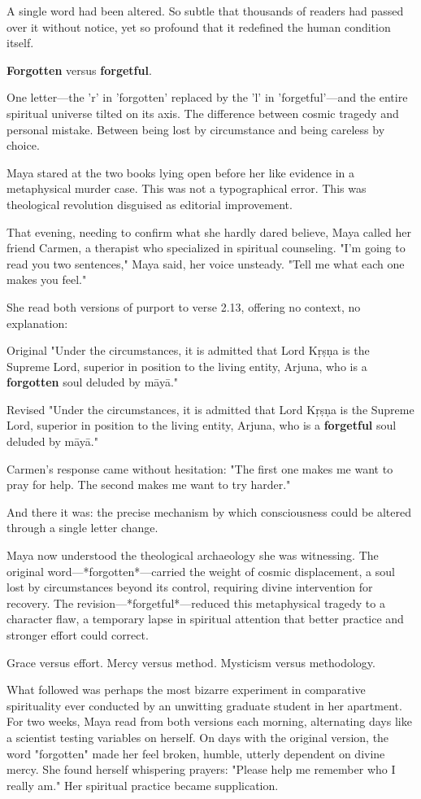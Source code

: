 \documentclass[12pt,twoside]{book}
\begin{document}
A single word had been altered. So subtle that thousands of readers had passed over it without notice, yet so profound that it redefined the human condition itself.

\textbf{Forgotten} versus \textbf{forgetful}. 

One letter—the 'r' in 'forgotten' replaced by the 'l' in 'forgetful'—and the entire spiritual universe tilted on its axis. The difference between cosmic tragedy and personal mistake. Between being lost by circumstance and being careless by choice.

Maya stared at the two books lying open before her like evidence in a metaphysical murder case. This was not a typographical error. This was theological revolution disguised as editorial improvement.

That evening, needing to confirm what she hardly dared believe, Maya called her friend Carmen, a therapist who specialized in spiritual counseling. "I'm going to read you two sentences," Maya said, her voice unsteady. "Tell me what each one makes you feel."

She read both versions of purport to verse 2.13, offering no context, no explanation:

Original
"Under the circumstances, it is admitted that Lord Kṛṣṇa is the Supreme Lord, superior in position to the living entity, Arjuna, who is a \textbf{forgotten} soul deluded by māyā."

Revised
"Under the circumstances, it is admitted that Lord Kṛṣṇa is the Supreme Lord, superior in position to the living entity, Arjuna, who is a \textbf{forgetful} soul deluded by māyā."

Carmen's response came without hesitation: "The first one makes me want to pray for help. The second makes me want to try harder."

And there it was: the precise mechanism by which consciousness could be altered through a single letter change.

Maya now understood the theological archaeology she was witnessing. The original word—*forgotten*—carried the weight of cosmic displacement, a soul lost by circumstances beyond its control, requiring divine intervention for recovery. The revision—*forgetful*—reduced this metaphysical tragedy to a character flaw, a temporary lapse in spiritual attention that better practice and stronger effort could correct.

Grace versus effort. Mercy versus method. Mysticism versus methodology.

What followed was perhaps the most bizarre experiment in comparative spirituality ever conducted by an unwitting graduate student in her apartment. For two weeks, Maya read from both versions each morning, alternating days like a scientist testing variables on herself. On days with the original version, the word "forgotten" made her feel broken, humble, utterly dependent on divine mercy. She found herself whispering prayers: "Please help me remember who I really am." Her spiritual practice became supplication.
\end{document}
